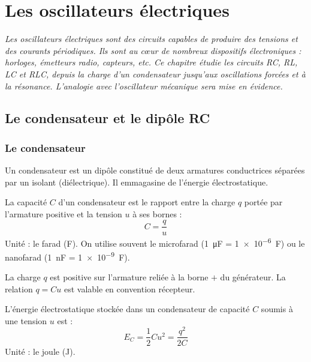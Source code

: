\chapter{Les oscillateurs électriques}

\textit{Les oscillateurs électriques sont des circuits capables de produire des tensions et des courants périodiques. Ils sont au cœur de nombreux dispositifs électroniques : horloges, émetteurs radio, capteurs, etc. Ce chapitre étudie les circuits RC, RL, LC et RLC, depuis la charge d’un condensateur jusqu’aux oscillations forcées et à la résonance. L’analogie avec l’oscillateur mécanique sera mise en évidence.}

\section{Le condensateur et le dipôle RC}

\subsection{Le condensateur}

\begin{definition}[Condensateur]
Un condensateur est un dipôle constitué de deux armatures conductrices séparées par un isolant (diélectrique). Il emmagasine de l’énergie électrostatique.
\end{definition}

\begin{propriete}[Capacité]
La capacité $C$ d’un condensateur est le rapport entre la charge $q$ portée par l’armature positive et la tension $u$ à ses bornes :
\[
C = \frac{q}{u}
\]
Unité : le farad (\si{\farad}). On utilise souvent le microfarad (\SI{1}{\micro\farad} = \SI{1e-6}{\farad}) ou le nanofarad (\SI{1}{\nano\farad} = \SI{1e-9}{\farad}).
\end{propriete}

\begin{remarque}
La charge $q$ est positive sur l’armature reliée à la borne $+$ du générateur. La relation $q = C u$ est valable en convention récepteur.
\end{remarque}

\begin{propriete}
L’énergie électrostatique stockée dans un condensateur de capacité $C$ soumis à une tension $u$ est :
\[
E_C = \frac{1}{2} C u^2 = \frac{q^2}{2C}
\]
Unité : le joule (\si{\joule}).
\end{propriete}

